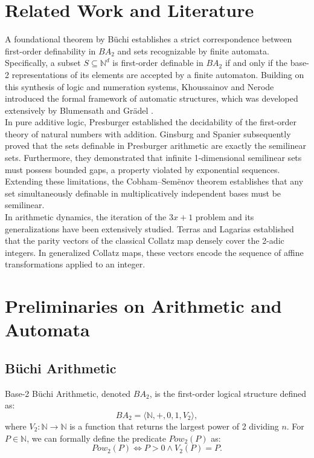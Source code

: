 \documentclass[11pt]{article}
\begin{document}
\section{Related Work and Literature}

A foundational theorem by B\"uchi \cite{Buchi} establishes a strict correspondence between first-order definability in $BA_2$ and sets recognizable by finite automata. Specifically, a subset $S \subseteq \mathbb{N}^d$ is first-order definable in $BA_2$ if and only if the base-2 representations of its elements are accepted by a finite automaton. Building on this synthesis of logic and numeration systems, Khoussainov and Nerode \cite{Khoussainov} introduced the formal framework of automatic structures, which was developed extensively by Blumensath and Gr\"adel \cite{Blumensath}. \\

In pure additive logic, Presburger \cite{Presburger} established the decidability of the first-order theory of natural numbers with addition. Ginsburg and Spanier \cite{Ginsburg} subsequently proved that the sets definable in Presburger arithmetic are exactly the semilinear sets. Furthermore, they demonstrated that infinite 1-dimensional semilinear sets must possess bounded gaps, a property violated by exponential sequences. Extending these limitations, the Cobham--Sem\"enov theorem \cite{Cobham, Semenov} establishes that any set simultaneously definable in multiplicatively independent bases must be semilinear. \\

In arithmetic dynamics, the iteration of the $3x+1$ problem and its generalizations have been extensively studied. Terras \cite{Terras} and Lagarias \cite{Lagarias} established that the parity vectors of the classical Collatz map densely cover the 2-adic integers. In generalized Collatz maps, these vectors encode the sequence of affine transformations applied to an integer. \\

\section{Preliminaries on Arithmetic and Automata}

\subsection{B\"uchi Arithmetic}

Base-2 B\"uchi Arithmetic, denoted $BA_2$, is the first-order logical structure defined as:
\[
BA_2 = \langle \mathbb{N}, +, 0, 1, V_2 \rangle,
\]
where $V_2 : \mathbb{N} \to \mathbb{N}$ is a function that returns the largest power of 2 dividing $n$. For $P \in \mathbb{N}$, we can formally define the predicate $Pow_2(P)$ as:
\[
Pow_2(P) \iff P > 0 \land V_2(P) = P.
\]
\end{document}
